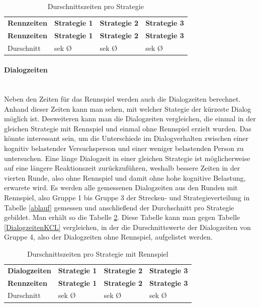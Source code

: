 \documentclass[12pt,a4paper]{scrartcl}
\begin{document}
\begin{longtable}{p{3cm}p{3cm}p{3cm}p{3cm} }
	\label{ZeitenDis}\\
	\caption[Durschnittszeiten pro Strategie]{Durschnittszeiten pro Strategie}\\
	\hline
	\textbf{Rennzeiten}&\textbf{Strategie 1}&\textbf{Strategie 2} &\textbf{Strategie 3}\\
	\hline
	\endfirsthead
	\hline
	\textbf{Rennzeiten}&\textbf{Strategie 1}&\textbf{Strategie 2} &\textbf{Strategie 3}\\
	\hline
	\endhead
Durschnitt & sek \O & sek \O & sek \O \\


\hline
\end{longtable}
\paragraph{Dialogzeiten}
~\\
Neben den Zeiten für das Rennspiel werden auch die Dialogzeiten berechnet. Anhand dieser Zeiten kann man sehen, mit welcher Stategie der kürzeste Dialog möglich ist. Desweiteren kann man die Dialogzeiten vergleichen, die einmal in der gleichen Strategie mit Rennspiel und einmal ohne Rennspiel erzielt wurden. Das könnte interessant sein, um die Unterschiede im Dialogverhalten zwischen einer kognitiv belastender Versuchsperson und einer weniger belastenden Person zu untersuchen. Eine länge Dialogzeit in einer gleichen Strategie ist möglicherweise auf eine längere Reaktionszeit zurückzuführen, weshalb bessere Zeiten in der vierten Runde, also ohne Rennspiel und damit ohne hohe kognitive Belastung, erwarete wird. Es werden alle gemessenen Dialogzeiten aus den Runden mit Rennspiel, also Gruppe 1 bis Gruppe 3 der Strecken- und Strategieverteilung in Tabelle \ref{ablauf} gemessen und anschließend der Durchschnitt pro Strategie gebildet. Man erhält so die Tabelle \ref{Dialogzeiten}. Diese Tabelle kann man gegen Tabelle \ref{DialogzeitenKCL} vergleichen, in der die Durschnittswerte der Dialogzeiten von Gruppe 4, also der Dialogzeiten ohne Rennspiel, aufgelistet werden. 

\begin{longtable}{p{3cm}p{3cm}p{3cm}p{3cm} }
	\label{Dialogzeiten}\\
	\caption[Durschnittszeiten pro Strategie]{Durschnittszeiten pro Strategie mit Rennspiel}\\
	\hline
	\textbf{Dialogzeiten}&\textbf{Strategie 1}&\textbf{Strategie 2} &\textbf{Strategie 3}\\
	\hline
	\endfirsthead
	\hline
	\textbf{Rennzeiten}&\textbf{Strategie 1}&\textbf{Strategie 2} &\textbf{Strategie 3}\\
	\hline
	\endhead
Durschnitt & sek \O & sek \O & sek \O \\


\hline
\end{longtable}
\end{document}
